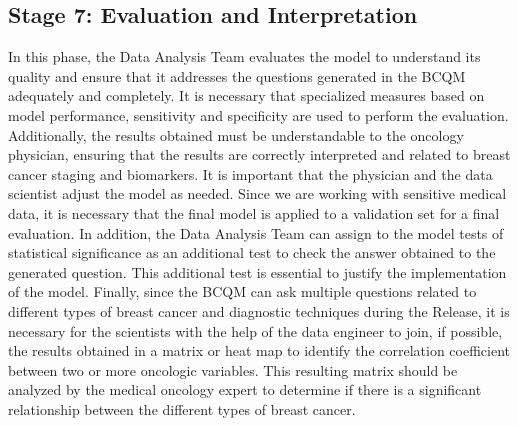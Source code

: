 \subsection*{Stage 7: Evaluation and Interpretation}
In this phase, the Data Analysis Team evaluates the model to understand its quality and ensure that it addresses the questions generated in the BCQM adequately and completely. It is necessary that specialized measures based on model performance, sensitivity and specificity are used to perform the evaluation. Additionally, the results obtained must be understandable to the oncology physician, ensuring that the results are correctly interpreted and related to breast cancer staging and biomarkers. It is important that the physician and the data scientist adjust the model as needed. Since we are working with sensitive medical data, it is necessary that the final model is applied to a validation set for a final evaluation. In addition, the Data Analysis Team can assign to the model tests of statistical significance as an additional test to check the answer obtained to the generated question. This additional test is essential to justify the implementation of the model. Finally, since the BCQM can ask multiple questions related to different types of breast cancer and diagnostic techniques during the Release, it is necessary for the scientists with the help of the data engineer to join, if possible, the results obtained in a matrix or heat map to identify the correlation coefficient between two or more oncologic variables. This resulting matrix should be analyzed by the medical oncology expert to determine if there is a significant relationship between the different types of breast cancer.
 
